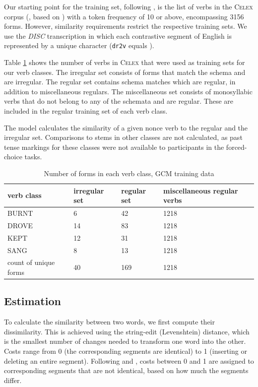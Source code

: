 \documentclass[12pt]{article}
\begin{document}
Our starting point for the training set, following \cite{albright2003rules}, is the list of verbs in the \textsc{Celex} corpus (\citealt{baayen1993celex}, based on \citealt{sinclair1987}) with a token frequency of 10 or above, encompassing 3156 forms. However, similarity requirements restrict the respective training sets. We use the {\em DISC} transcription in which each contrastive segment of English is represented by a unique character (\texttt{dr2v} equals \textipa{[draIv]}).

Table \ref{gcmsetsize} shows the number of verbs in \textsc{Celex} that were used as training sets for our verb classes. The irregular set consists of forms that match the schema and are irregular. The regular set contains schema matches which are regular, in addition to miscellaneous regulars. The miscellaneous set consists of monosyllabic verbs that do not belong to any of the schemata and are regular. These are included in the regular training set of each verb class. 

The model calculates the similarity of a given nonce verb to the regular and the irregular set. Comparisons to stems in other classes are not calculated, as past tense markings for these classes were not available to participants in the forced-choice tasks.

\begin{table}[ht]
\centering
\begin{tabular}{llll}
  \hline
verb class & irregular set & regular set & miscellaneous regular verbs \\ 
  \hline
BURNT & 6 & 42 & 1218 \\ 
  DROVE & 14 & 83 & 1218 \\ 
  KEPT & 12 & 31 & 1218 \\ 
  SANG & 8 & 13 & 1218 \\ 
  count of unique forms & 40 & 169 & 1218 \\ 
   \hline
\end{tabular}
\caption{Number of forms in each verb class, GCM training data} 
\label{gcmsetsize}
\end{table}
\subsection{Estimation}

To calculate the similarity between two words, we first compute their dissimilarity. This is achieved using the string-edit (Levenshtein) distance, which is the smallest number of changes needed to transform one word into the other. Costs range from 0 (the corresponding segments are identical) to 1 (inserting or deleting an entire segment). Following \cite{albright2003rules} and \cite{dawdy2014learnability}, costs between 0 and 1 are assigned to corresponding segments that are not identical, based on how much the segments differ. 
\end{document}
